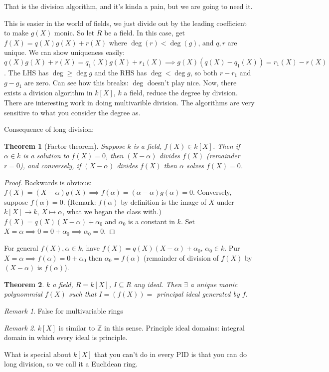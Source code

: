 \documentclass{article}
\theoremstyle{plain}
\newtheorem{theorem}{Theorem}
\theoremstyle{remark}
\newtheorem{remark}{Remark}
\newcommand{\Z}{{\mathbb Z}}
\begin{document}
That is the division algorithm, and it's kinda a pain,
but we are going to need it.

This is easier in the world of fields, we just divide out by the
leading coefficient to make $g(X)$ monic.
So let $R$ be a field.
In this case, get $f(X) = q(X)g(X) + r(X)$ where $\deg(r)<\deg(g)$,
and $q,r$ are unique.
We can show uniqueness easily:
$q(X)g(X) + r(X) = q_1(X)g(X) + r_1(X)
\implies g(X)(q(X)-q_1(X)) = r_1(X) - r(X)$.
The LHS has $\deg \geq \deg g$ and the RHS has $\deg < \deg g$,
so both $r-r_1$ and $g-g_1$ are zero.
Can see how this breaks: $\deg$ doesn't play nice.
Now, there exists a division algorithm in $k[X]$, $k$ a field,
reduce the degree by division.
There are interesting work in doing multivarible division.
The algorithms are very sensitive to what you consider the degree as.

Consequence of long division:
\begin{theorem}[Factor theorem]
	Suppose $k$ is a field, $f(X) \in k[X]$.
	Then if $\alpha \in k$ is a solution to $f(X) = 0$,
	then $(X-\alpha)$ divides $f(X)$ (remainder $r = 0$),
	and conversely, if $(X-\alpha)$ divides $f(X)$ then $\alpha$ solves $f(X) = 0$.
\end{theorem}
\begin{proof}
	Backwards is obvious: $f(X) = (X-\alpha)g(X) \implies f(\alpha) = (\alpha-\alpha)g(\alpha) = 0$.
	Conversely, suppose $f(\alpha) = 0$.
	(Remark: $f(\alpha)$ by definition is the image of $X$ under $k[X] \to k$, $X \mapsto \alpha$,
	what we began the class with.)
	$f(X) = q(X)(X-\alpha) + \alpha_0$ and $\alpha_0$ is a constant in $k$.
	Set $X = \alpha \implies 0 = 0 + \alpha_0 \implies \alpha_0 = 0$.
\end{proof}

For general $f(X), \alpha \in k$,
have $f(X) = q(X)(X-\alpha) + \alpha_0$, $\alpha_0 \in k$.
Pur $X = \alpha \implies f(\alpha) = 0 + \alpha_0$ then $\alpha_0 = f(\alpha)$
(remainder of division of $f(X)$ by $(X-\alpha)$ is $f(\alpha)$).

\begin{theorem}
	$k$ a field, $R = k[X]$, $I \subseteq R$ any ideal.
	Then $\exists$ a unique monic polynommial $f(X)$
	such that $I = (f(X)) = $ principal ideal generated by $f$.
\end{theorem}
\begin{remark}
	False for multivariable rings
\end{remark}
\begin{remark}
	$k[X]$ is similar to $\Z$ in this sense.
	Principle ideal domains: integral domain in which every ideal is principle.
\end{remark}
What is special about $k[X]$ that you can't do in every PID is that
you can do long division, so we call it a Euclidean ring.
\end{document}
